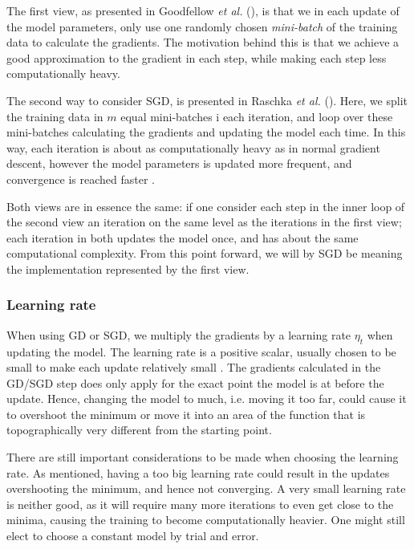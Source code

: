 The first view, as presented in Goodfellow \textit{et al.} (\citeyear[p. 291]{Goodfellow-et-al-2016}), is that we in each update of the model parameters, only use one randomly chosen \textit{mini-batch} of the training data to calculate the gradients.
The motivation behind this is that we achieve a good approximation to the gradient in each step, while making each step less computationally heavy.

The second way to consider SGD, is presented in Raschka \textit{et al.} (\citeyear[p. 47]{raschka}).
Here, we split the training data in $m$ equal mini-batches i each iteration, and loop over these mini-batches calculating the gradients and updating the model each time.
In this way, each iteration is about as computationally heavy as in normal gradient descent, however the model parameters is updated more frequent, and convergence is reached faster \citep[p. 47]{raschka}.

Both views are in essence the same: if one consider each step in the inner loop of the second view an iteration on the same level as the iterations in the first view; each iteration in both updates the model once, and has about the same computational complexity.
From this point forward, we will by SGD be meaning the implementation represented by the first view.

\subsubsection{Learning rate}
When using GD or SGD, we multiply the gradients by a learning rate $\eta_t$ when updating the model.
The learning rate is a positive scalar, usually chosen to be small to make each update relatively small \citep[p. 84]{Goodfellow-et-al-2016}.
The gradients calculated in the GD/SGD step does only apply for the exact point the model is at before the update.
Hence, changing the model to much, i.e. moving it too far, could cause it to overshoot the minimum or move it into an area of the function that is topographically very different from the starting point.

There are still important considerations to be made when choosing the learning rate.
As mentioned, having a too big learning rate could result in the updates overshooting the minimum, and hence not converging.
A very small learning rate is neither good, as it will require many more iterations to even get close to the minima, causing the training to become computationally heavier.
One might still elect to choose a constant model by trial and error.

